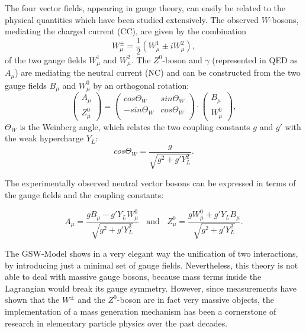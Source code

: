 The four vector fields, appearing in gauge theory, can easily be related to the physical quantities which have been studied extensively. 
The observed $W$-bosons, mediating the charged current (CC), are given by the combination
\begin{equation}\label{EWtrafo1}
 W^{\pm}_\mu = \frac{1}{2}(W^{1}_\mu\pm iW^{2}_\mu),
\end{equation}
of the two gauge fields $W^{1}_\mu$ and $W^{2}_\mu$. The $Z^0$-boson and $\gamma$ (represented in QED as $A_\mu$) are mediating the neutral current (NC) and can be constructed from the two gauge fields $B_{\mu}$ and $W_{\mu}^{0}$ by an orthogonal rotation:
\begin{equation}\label{EWtrafo2}
\begin{pmatrix}
A_\mu\\
Z^0_\mu
\end{pmatrix}
=
\begin{pmatrix}
cos\Theta_W & sin\Theta_ W \\
-sin\Theta_W & cos\Theta_W  \\

\end{pmatrix}
\cdot 
\begin{pmatrix}
B_\mu\\
W^0_\mu
\end{pmatrix},
\end{equation}
 $\Theta_W$ is the Weinberg angle, which relates the two coupling constants $g$ and $g'$ with the weak hypercharge $Y_L$:
\begin{equation}\label{Weinber2}
cos \Theta_W = \frac{g}{\sqrt{g^2+g'Y^2_L}}.
\end{equation} 

The experimentally observed neutral vector bosons can be expressed in terms of the gauge fields and the coupling constants: 

\begin{equation}
A_\mu = \frac{gB_\mu -g'Y_LW_\mu^0}{\sqrt{g^2+g'Y^2_L}} ~~~~\mathrm{and} ~~~~Z_\mu^0 = \frac{gW_\mu^0 +g'Y_LB_\mu}{\sqrt{g^2+g'Y^2_L}}.
\end{equation}

The GSW-Model shows in a very elegant way the unification of two interactions, by introducing just a minimal set of gauge fields. Nevertheless, this theory is not able to deal with massive gauge bosons, because mass terms inside the Lagrangian would break its gauge symmetry. However, since measurements have shown that the $W^\pm$ and the $Z^0$-boson are in fact very massive objects, the implementation of a mass generation mechanism has been a cornerstone of research in elementary particle physics over the past decades.

